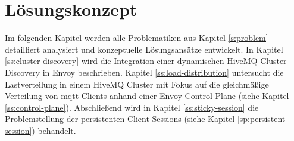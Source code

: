 \section{Lösungskonzept} \label{s:solution}
Im folgenden Kapitel werden alle Problematiken aus Kapitel \ref{s:problem} detailliert analysiert und konzeptuelle Lösungsansätze entwickelt.
In Kapitel \ref{ss:cluster-discovery} wird die Integration einer dynamischen HiveMQ Cluster-Discovery in Envoy beschrieben.
Kapitel \ref{ss:load-distribution} untersucht die Lastverteilung in einem HiveMQ Cluster mit Fokus auf die gleichmä{\ss}ige Verteilung von \ac{mqtt} Clients anhand einer Envoy Control-Plane (siehe Kapitel \ref{ss:control-plane}).
Abschlie{\ss}end wird in Kapitel \ref{ss:sticky-session} die Problemstellung der persistenten Client-Sessions (siehe Kapitel \ref{sp:persistent-session}) behandelt.

